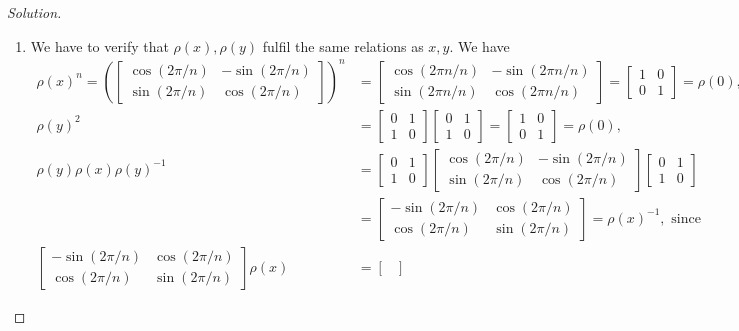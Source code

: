 \begin{proof}[Solution]
\begin{enumerate}[font=\normalfont,label=\textbf{(\alph*)}, wide]
\item We have to verify that $\rho(x), \rho(y)$ fulfil the same relations as $x, y$. We have
\[
\begin{aligned}
\rho(x)^n =
\left(
\begin{bmatrix}
\cos(2\pi/n) & -\sin(2\pi/n) \\
\sin(2\pi/n) & \cos(2\pi/n)
\end{bmatrix}
\right)^n &=
\begin{bmatrix}
\cos(2\pi n/n) & -\sin(2\pi n/n) \\
\sin(2\pi n/n) & \cos(2\pi n/n)
\end{bmatrix}
=
\begin{bmatrix}
1 & 0 \\
0 & 1
\end{bmatrix}
= \rho(0), \\
\rho(y)^2 &=
\begin{bmatrix}
0 & 1 \\
1 & 0
\end{bmatrix}
\begin{bmatrix}
0 & 1 \\
1 & 0
\end{bmatrix}
=
\begin{bmatrix}
1 & 0 \\
0 & 1
\end{bmatrix}
= \rho(0), \\
\rho(y)\rho(x)\rho(y)^{-1} &=
\begin{bmatrix}
0 & 1 \\
1 & 0
\end{bmatrix}
\begin{bmatrix}
\cos(2\pi/n) & -\sin(2\pi/n) \\
\sin(2\pi/n) & \cos(2\pi/n)
\end{bmatrix}
\begin{bmatrix}
0 & 1 \\
1 & 0
\end{bmatrix}
\\
&=
\begin{bmatrix}
-\sin(2\pi/n) & \cos(2\pi/n) \\
\cos(2\pi/n) & \sin(2\pi/n)
\end{bmatrix}
= \rho(x)^{-1}, \text{ since} \\
\begin{bmatrix}
-\sin(2\pi/n) & \cos(2\pi/n) \\
\cos(2\pi/n) & \sin(2\pi/n)
\end{bmatrix}
\rho(x) &=
\begin{bmatrix}

\end{bmatrix}
\end{aligned}\]
\end{enumerate}
\end{proof}
